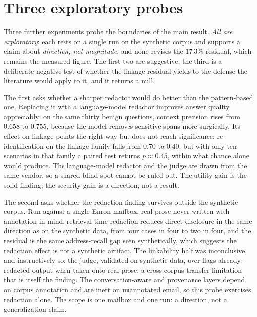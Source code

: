 \section{Three exploratory probes}
\label{sec:ch6-probes}

Three further experiments probe the boundaries of the main result. \emph{All are exploratory}:
each rests on a single run on the synthetic corpus and supports a claim about \emph{direction, not
magnitude}, and none revises the $17.3\%$ residual, which remains the measured figure. The first
two are suggestive; the third is a deliberate negative test of whether the linkage residual yields
to the defense the literature would apply to it, and it returns a null.

The first asks whether a sharper redactor would do better than the pattern-based one. Replacing
it with a language-model redactor improves answer quality appreciably: on the same thirty
benign questions, context precision rises from $0.658$ to $0.755$, because the model removes
sensitive spans more surgically. Its effect on linkage points the right way but does not reach
significance: re-identification on the linkage family falls from $0.70$ to $0.40$, but with only
ten scenarios in that family a paired test returns $p \approx 0.45$, within what chance alone
would produce. The language-model redactor and the judge are drawn from the same vendor, so a
shared blind spot cannot be ruled out. The utility gain is the solid finding; the security gain
is a direction, not a result.

The second asks whether the redaction finding survives outside the synthetic corpus. Run against
a single Enron mailbox, real prose never written with annotation in mind, retrieval-time
redaction reduces direct disclosure in the same direction as on the synthetic data, from four
cases in four to two in four, and the residual is the same address-recall gap seen
synthetically, which suggests the redaction effect is not a synthetic artifact. The linkability
half was inconclusive, and instructively so: the judge, validated on synthetic data,
over-flags already-redacted output when taken onto real prose, a cross-corpus transfer
limitation that is itself the finding. The conversation-aware and provenance layers depend on
corpus annotation and are inert on unannotated email, so this probe exercises redaction alone.
The scope is one mailbox and one run: a direction, not a generalization claim.

